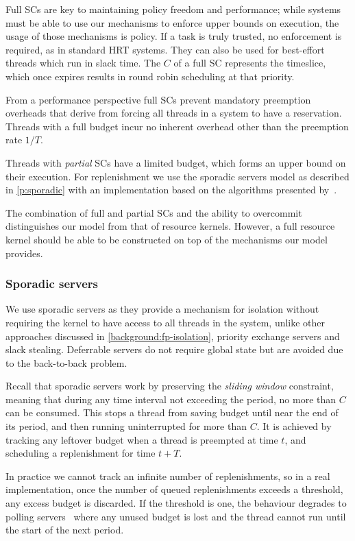 Full \glspl{SC} are key to maintaining policy freedom and performance; while systems
must be able to use our mechanisms to enforce upper bounds on execution, the usage of 
those mechanisms is policy. If a task is truly trusted, no enforcement is required,
as in standard \gls{HRT} systems. They can also be used for best-effort threads which run in slack time.
The \(C\) of a full \gls{SC} represents the timeslice, which once expires results in round robin
scheduling at that priority. 

From a performance perspective full \glspl{SC} prevent mandatory preemption overheads 
that derive from forcing all threads in a system to have a reservation. Threads with a full
budget incur no inherent overhead other than the preemption rate $1/T$.

Threads with \emph{partial} \glspl{SC} have a limited budget, which forms an upper
bound on their execution. For replenishment we
use the sporadic servers model as described in \cref{p:sporadic} with an
implementation based on the algorithms presented
by~\citet{Stanovic_BWH_10}. 

The combination of full and partial \glspl{SC}  and the ability to overcommit distinguishes our
model from that of resource kernels. However, a full resource kernel should be able to be
constructed on top of the mechanisms our model provides.

\subsubsection{Sporadic servers}

We use sporadic servers as they provide a mechanism for isolation without requiring the kernel
to have access to all threads in the system, unlike other approaches discussed in
\cref{background:fp-isolation}, \eg  priority exchange servers and slack stealing.
Deferrable servers do not require global state but are avoided due to the back-to-back
problem. 

Recall that sporadic servers work by preserving the
\emph{sliding window} constraint, meaning that during any time
interval not exceeding the period, no more than $C$ can be consumed.
This stops a thread from saving budget until near the end of its
period, and then running uninterrupted for more than $C$. It is achieved by tracking any leftover
budget when
a thread is preempted at time \(t\), and scheduling a replenishment for time  $t+T$.

In practice we cannot track an infinite number of
replenishments, so in a real implementation, once the number of
queued replenishments exceeds a threshold, any excess budget is
discarded. If the threshold is one, the behaviour degrades to polling
servers~\citep{Sprunt_SL_89a} where any unused budget is lost and the
thread cannot run until the start of the next period.

